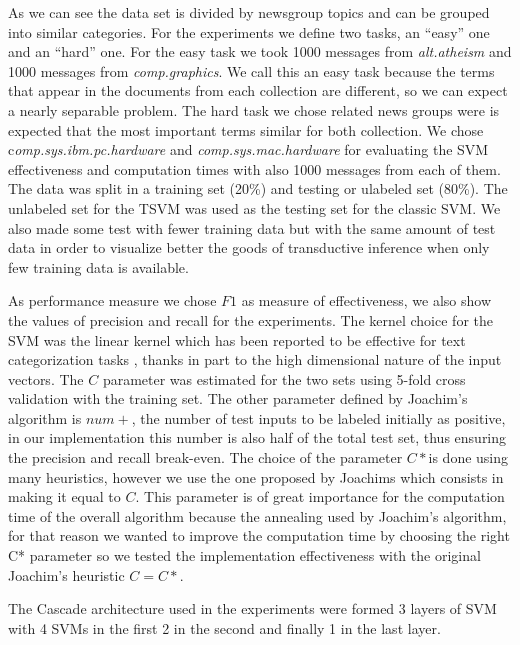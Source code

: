 As we can see the data set is divided by newsgroup topics and can
be grouped into similar categories. For the experiments we define
two tasks, an {}``easy'' one and an {}``hard'' one. For the easy
task we took 1000 messages from \emph{alt.atheism }and 1000 messages
from \emph{comp.graphics}. We call this an easy task because the terms
that appear in the documents from each collection are different, so
we can expect a nearly separable problem. The hard task we chose related
news groups were is expected that the most important terms similar
for both collection. We chose c\emph{omp.sys.ibm.pc.hardware} and
\emph{comp.sys.mac.hardware }for evaluating the SVM effectiveness
and computation times with also 1000 messages from each of them. The
data was split in a training set (20\%) and testing or ulabeled set
(80\%). The unlabeled set for the TSVM was used as the testing set
for the classic SVM. We also made some test with fewer training data
but with the same amount of test data in order to visualize better
the goods of transductive inference when only few training data is
available.

As performance measure we chose $F1$ as measure of effectiveness,
we also show the values of precision and recall for the experiments.
The kernel choice for the SVM was the linear kernel which has been
reported to be effective for text categorization tasks \cite{Joachims99c,DumaisPHS98},
thanks in part to the high dimensional nature of the input vectors.
The $C$ parameter was estimated for the two sets using 5-fold cross
validation with the training set. The other parameter defined by Joachim's
algorithm is $num+$, the number of test inputs to be labeled initially
as positive, in our implementation this number is also half of the
total test set, thus ensuring the precision and recall break-even.
The choice of the parameter $C*$is done using many heuristics, however
we use the one proposed by Joachims which consists in making it equal
to $C$. This parameter is of great importance for the computation
time of the overall algorithm because the annealing used by Joachim's
algorithm, for that reason we wanted to improve the computation time
by choosing the right C{*} parameter so we tested the implementation
effectiveness with the original Joachim's heuristic $C=C*$. %

{}

The Cascade architecture used in the experiments were formed 3 layers
of SVM with 4 SVMs in the first 2 in the second and finally 1 in the
last layer.

